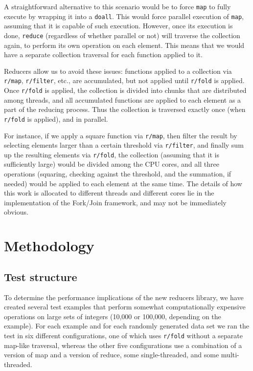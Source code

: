 \documentclass[12pt]{article}
\newcommand{\comment}[1]{{\bf \tt  {#1}}}
\newcommand{\emcomment}[1]{\textcolor{ForestGreen}{\comment{Elena: {#1}}}}
\newcommand{\clocode}[1]{{\texttt {#1}}}
\begin{document}
A straightforward  alternative to this scenario would be to force \clocode{map} to fully execute by wrapping it into a \clocode{doall}. This would force parallel execution of  \clocode{map}, assuming that it is capable of such execution. However, once its execution is done, \clocode{reduce} (regardless of whether parallel or not) will traverse the collection again, to perform its own operation on each element. This means that we would have a separate collection traversal for each function applied to it. 

Reducers allow us to avoid these issues: functions applied to a collection via \clocode{r/map}, \clocode{r/filter}, etc., are accumulated, but not applied until \clocode{r/fold} is applied. Once \clocode{r/fold} is applied, the collection is divided into chunks that are distributed among threads, and all accumulated functions are applied to each element as a part of the reducing process.
Thus the collection is traversed exactly once (when \clocode{r/fold} is applied), and in parallel. 

For instance, if we apply a square function via \clocode{r/map}, then filter the result by selecting elements larger than a certain threshold via \clocode{r/filter}, and finally sum up the resulting elements via \clocode{r/fold}, the collection (assuming that it is sufficiently large) would be divided among the CPU cores, and all three operations (squaring, checking against the threshold, and the summation, if needed) would be applied to each element at the same time. 
The details of how this work is allocated to different threads and different cores lie in the implementation of the Fork/Join framework, and may not be immediately obvious. 


\section{Methodology}\label{sec:methodology} 

\subsection{Test structure}\label{sec:testStruct}
To determine the performance implications of the new reducers library, we have created several test examples that perform somewhat computationally expensive operations on large sets of integers (10,000 or 100,000, depending on the example). For each example and for each randomly generated data set we ran the test in six different configurations, one of which uses \clocode{r/fold} without a separate map-like traversal, whereas the other five configurations use a combination of a version of map and a version of reduce, some single-threaded, and some multi-threaded. 
\end{document}

